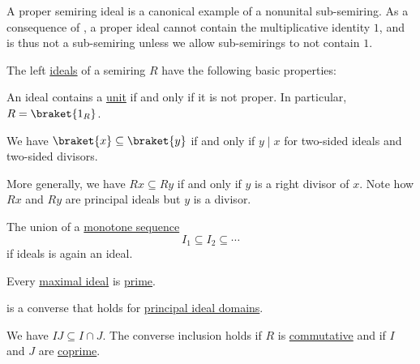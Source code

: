 \begin{remark}\label{rem:semiring_ideal_as_sub_semiring}
  A proper semiring ideal is a canonical example of a nonunital sub-semiring. As a consequence of , a proper ideal cannot contain the multiplicative identity \( 1 \), and is thus not a sub-semiring unless we allow sub-semirings to not contain \( 1 \).
\end{remark}

\begin{proposition}\label{thm:def:semiring_ideal/properties}
  The left \hyperref[def:semiring_ideal]{ideals} of a semiring \( R \) have the following basic properties:
  \begin{thmenum}[series=thm:def:semiring_ideal/properties]
     An ideal contains a \hyperref[def:divisibility/unit]{unit} if and only if it is not proper. In particular, \( R = \braket{ 1_R } \).

     We have \( \braket{ x } \subseteq \braket{ y } \) if and only if \( y \mid x \) for two-sided ideals and two-sided divisors.

    More generally, we have \( Rx \subseteq Ry \) if and only if \( y \) is a right divisor of \( x \). Note how \( Rx \) and \( Ry \) are  principal ideals but \( y \) is a  divisor.

     The union of a \hyperref[eq:def:partially_ordered_set/homomorphism/sequence]{monotone sequence}
    \begin{equation*}
      I_1 \subseteq I_2 \subseteq \cdots
    \end{equation*}
    if ideals is again an ideal.

     Every \hyperref[def:semiring_ideal/maximal]{maximal ideal} is \hyperref[def:semiring_ideal/prime]{prime}.

     is a converse that holds for \hyperref[def:principal_ideal_domain]{principal ideal domains}.

     We have \( IJ \subseteq I \cap J \). The converse inclusion holds if \( R \) is \hyperref[def:semiring/commutative]{commutative} and if \( I \) and \( J \) are \hyperref[def:semiring_ideal/coprime]{coprime}.
  \end{thmenum}


\end{proposition}
